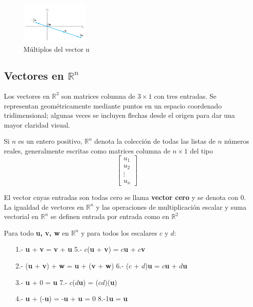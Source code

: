 \documentclass{article}
\begin{document}
\begin{figure}[ht]
    \centerline{\includegraphics[width=0.3\textwidth]{image9.png}}
    \caption{Múltiplos del vector u}
    \label{}
\end{figure}

\subsection*{Vectores en $\mathbb{R}^n$}

Los vectores en $\mathbb{R}^3$ son matrices columna de $3 \times 1$ con tres entradas. Se representan geométricamente mediante puntos en un espacio coordenado tridimensional; algunas veces se incluyen flechas desde el origen para dar una mayor claridad visual.

Si $n$ es un entero positivo, $\mathbb{R}^n$ denota la colección de todas las listas de $n$ números reales, generalmente escritas como matrices columna de $n \times 1$ del tipo $$\begin{bmatrix} u_1\\u_2\\ \vdots\\u_n \end{bmatrix}$$

El vector cuyas entradas son todas cero se llama \textbf{vector cero} y se denota con 0. La igualdad de vectores en $\mathbb{R}^n$ y las operaciones de multiplicación escalar y suma vectorial en $\mathbb{R}^n$ se definen entrada por entrada como en $\mathbb{R}^2$

\begin{tcolorbox}[colback=blue!10!white,colframe=blue!60!black,title=Propiedades Algebraicas de $\mathbb{R}^n$]
    Para todo \textbf{u, v, w} en $\mathbb{R}^n$ y para todos los escalares $c$ y $d$:
    \begin{itemize}
        \item[1.-] \textbf{u} + \textbf{v} = \textbf{v} + \textbf{u} \hspace{65mm} 5.- $c$(\textbf{u} + \textbf{v}) = $c$\textbf{u} + $c$\textbf{v}
        \item[2.-] (\textbf{u} + \textbf{v}) + \textbf{w} = \textbf{u} + (\textbf{v} + \textbf{w}) \hspace{43.5mm} 6.- ($c$ + $d$)\textbf{u} = $c$\textbf{u} + $d$\textbf{u}
        \item[3.-] \textbf{u} + 0 = \textbf{u} \hspace{73mm} 7.- $c$($d$\textbf{u}) = ($cd$)(\textbf{u})
        \item[4.-] \textbf{u} + (-\textbf{u}) = -\textbf{u} + \textbf{u} = 0 \hspace{53.2mm} 8.-1\textbf{u} = \textbf{u}    
    \end{itemize}
\end{tcolorbox}
\end{document}

